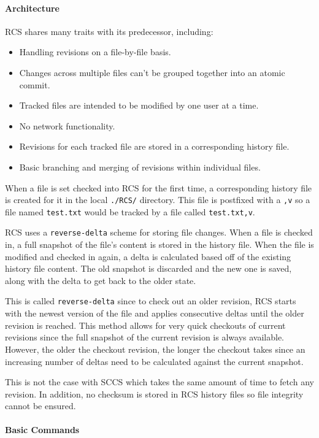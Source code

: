 \paragraph{Architecture}
RCS shares many traits with its predecessor, including:
\begin{itemize}
    \item Handling revisions on a file-by-file basis.
    \item Changes across multiple files can't be grouped together into an atomic commit.
    \item Tracked files are intended to be modified by one user at a time.
    \item No network functionality.
    \item Revisions for each tracked file are stored in a corresponding history file.
    \item Basic branching and merging of revisions within individual files.
\end{itemize}
When a file is set checked into RCS for the first time, a corresponding history file is created for it in the local \lstinline{./RCS/} directory. This file is postfixed with a \lstinline{,v} so a file named \lstinline{test.txt} would be tracked by a file called \lstinline{test.txt,v}.

RCS uses a \lstinline{reverse-delta} scheme for storing file changes. When a file is checked in, a full snapshot of the file's content is stored in the history file. When the file is modified and checked in again, a delta is calculated based off of the existing history file content. The old snapshot is discarded and the new one is saved, along with the delta to get back to the older state.

This is called \lstinline{reverse-delta} since to check out an older revision, RCS starts with the newest version of the file and applies consecutive deltas until the older revision is reached. This method allows for very quick checkouts of current revisions since the full snapshot of the current revision is always available. However, the older the checkout revision, the longer the checkout takes since an increasing number of deltas need to be calculated against the current snapshot.

This is not the case with SCCS which takes the same amount of time to fetch any revision. In addition, no checksum is stored in RCS history files so file integrity cannot be ensured.

\paragraph{Basic Commands}

